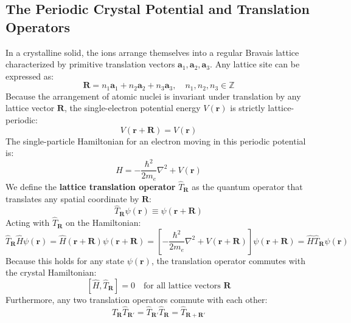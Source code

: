\documentclass[11pt,a4paper]{article}
\newcommand{\vb}[1]{\mathbf{#1}}
\begin{document}
\subsection{The Periodic Crystal Potential and Translation Operators}
In a crystalline solid, the ions arrange themselves into a regular Bravais lattice characterized by primitive translation vectors $\vb{a}_1, \vb{a}_2, \vb{a}_3$. Any lattice site can be expressed as:
\begin{equation}
\vb{R} = n_1 \vb{a}_1 + n_2 \vb{a}_2 + n_3 \vb{a}_3, \quad n_1, n_2, n_3 \in \mathbb{Z}
\end{equation}
Because the arrangement of atomic nuclei is invariant under translation by any lattice vector $\vb{R}$, the single-electron potential energy $V(\vb{r})$ is strictly lattice-periodic:
\begin{equation}
V(\vb{r} + \vb{R}) = V(\vb{r})
\end{equation}
The single-particle Hamiltonian for an electron moving in this periodic potential is:
\begin{equation}
\hat{H} = -\frac{\hbar^2}{2m_e}\nabla^2 + V(\vb{r})
\label{eq:crystal_hamiltonian}
\end{equation}
We define the \textbf{lattice translation operator} $\hat{T}_{\vb{R}}$ as the quantum operator that translates any spatial coordinate by $\vb{R}$:
\begin{equation}
\hat{T}_{\vb{R}}\psi(\vb{r}) \equiv \psi(\vb{r} + \vb{R})
\label{eq:translation_operator_def}
\end{equation}
Acting with $\hat{T}_{\vb{R}}$ on the Hamiltonian:
\begin{equation}
\hat{T}_{\vb{R}}\hat{H}\psi(\vb{r}) = \hat{H}(\vb{r}+\vb{R})\psi(\vb{r}+\vb{R}) = \left[ -\frac{\hbar^2}{2m_e}\nabla^2 + V(\vb{r}+\vb{R}) \right]\psi(\vb{r}+\vb{R}) = \hat{H}\hat{T}_{\vb{R}}\psi(\vb{r})
\end{equation}
Because this holds for any state $\psi(\vb{r})$, the translation operator commutes with the crystal Hamiltonian:
\begin{equation}
\boxed{[\hat{H}, \hat{T}_{\vb{R}}] = 0 \quad \text{for all lattice vectors } \vb{R}}
\label{eq:translation_commutation}
\end{equation}
Furthermore, any two translation operators commute with each other:
\begin{equation}
\hat{T}_{\vb{R}}\hat{T}_{\vb{R}'} = \hat{T}_{\vb{R}'}\hat{T}_{\vb{R}} = \hat{T}_{\vb{R}+\vb{R}'}
\label{eq:translation_composition}
\end{equation}
\end{document}
